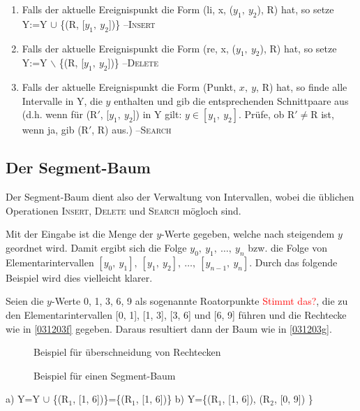 \begin{enumerate}
\item Falls der aktuelle Ereignispunkt die Form (li, x, ($y_1,\ y_2$), R) hat, so setze Y:=Y $\cup$ \{(R, [$y_1,\ y_2$])\} --\textsc{Insert}
\item Falls der aktuelle Ereignispunkt die Form (re, x, ($y_1,\ y_2$), R) hat, so setze Y:=Y $\backslash$ \{(R, [$y_1,\ y_2$])\}
--\textsc{Delete}
\item Falls der aktuelle Ereignispunkt die Form (Punkt, $x,\ y$, R) hat, so finde alle Intervalle in Y, die $y$  enthalten und gib die
entsprechenden Schnittpaare aus (d.h. wenn für (R$'$, [$y_1,\ y_2$]) in Y gilt: $y \in [y_1,\ y_2]$. Prüfe, ob R$' \neq$R ist, wenn
ja, gib (R$'$, R) aus.) --\textsc{Search}
\end{enumerate}
\subsection{Der Segment-Baum}
Der Segment-Baum dient also der Verwaltung von Intervallen, wobei die üblichen Operationen \textsc{Insert}, \textsc{Delete} und
\textsc{Search} mögloch sind.

Mit der Eingabe ist die Menge der $y$-Werte gegeben, welche nach steigendem $y$ geordnet wird. Damit ergibt sich die Folge $y_0,\ y_1,\
\ldots,\ y_n$ bzw. die Folge von Elementarintervallen $[y_0,\ y_1],\ [y_1,\ y_2],\ \ldots,\ [y_{n-1},\ y_n]$. Durch das folgende
Beispiel wird dies vielleicht klarer.

Seien die $y$-Werte 0, 1, 3, 6, 9 als sogenannte Roatorpunkte \textcolor{red}{Stimmt das?}, die zu den Elementarintervallen
[0, 1], [1, 3], [3, 6] und [6, 9] führen und die Rechtecke wie in \autoref{031203f} gegeben. Daraus resultiert dann der Baum wie in
\autoref{031203g}.

\begin{figure}[H]
\centering

\caption{Beispiel für überschneidung von Rechtecken}
\label{031203f}

\end{figure}

\begin{figure}[H]
\centering
 
\caption{Beispiel für einen Segment-Baum}
\label{031203g}

\end{figure}

 a) Y=Y $\cup$ \{(R$_1$, [1, 6])\}=\{(R$_1$, [1, 6])\} \hspace{2em} b) Y=\{(R$_1$, [1, 6]), (R$_2$, [0, 9]) \}

